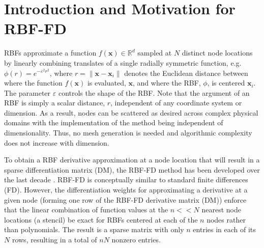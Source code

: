 

%


\section{Introduction and Motivation for RBF-FD}
\label{sec:rbf}

RBFs approximate a function $f(\mathbf{x}) \in \mathbb{R}^d$ sampled at $N$ distinct node locations by linearly combining translates of a single radially symmetric function, e.g. $\phi(r) = e^{-\varepsilon^2r^2}$, where $r=\|\mathbf{x}-\mathbf{x}_{i}\|$ denotes the Euclidean distance between where the function $f(\mathbf{x})$ is evaluated, $\mathbf{x}$, and where the RBF, $\phi$, is centered $\mathbf{x}_{i}$. The parameter $\varepsilon$ controls the shape of the RBF. Note that the argument of an RBF is simply a scalar distance, $r$, independent of any coordinate system or dimension. As a result, nodes can be scattered as desired across complex physical domains with the implementation of the method being independent of dimensionality. Thus, no mesh generation is needed and algorithmic complexity does not increase with dimension.

To obtain a RBF derivative approximation at a node location that will result in a sparse differentiation matrix (DM), the RBF-FD method has been developed over the last decade \cite{TAI1,TAI2,SDY02,WrFo06}. RBF-FD is conceptually similar to standard finite differences (FD). 
However, the differentiation weights for approximating a derivative at a given node (forming one row of the RBF-FD derivative matrix (DM)) enforce that the linear combination of function values at the $n << N$ nearest node locations (a stencil) be exact for RBFs centered at each of the $n$ nodes rather than polynomials. The result is a sparse matrix with only $n$ entries in each of its $N$ rows, resulting in a total of $nN$ nonzero entries.

